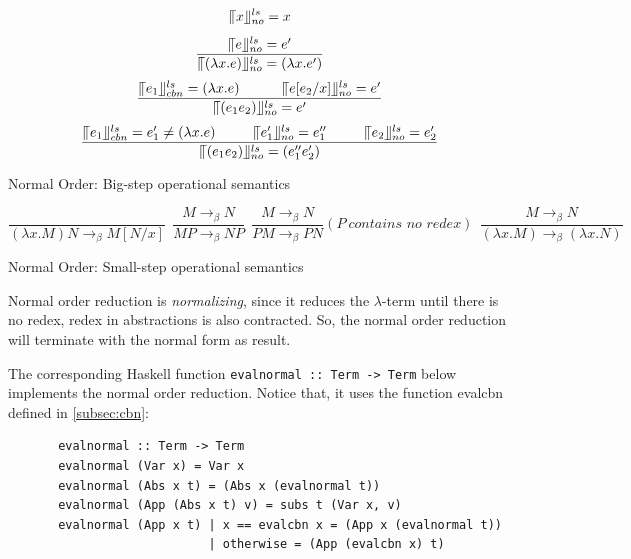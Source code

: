 \begin{equation*}
\llceil x \rrfloor ^{ls} _{no} = x
\end{equation*}
\begin{equation*}
\frac{\llceil e \rrfloor ^{ls} _{no} = e'}{\llceil (\lambda x.e) \rrfloor ^{ls} _{no} = (\lambda x.e')}
\end{equation*}
\begin{equation*}
\frac{\llceil e_1 \rrfloor ^{ls} _{cbn} = (\lambda x.e)\ \ \ \ \ \ \ \ \ \llceil e[e_2/x] \rrfloor ^{ls} _{no} = e'}{\llceil (e_1e_2) \rrfloor ^{ls} _{no} = e'}
\end{equation*}
\begin{equation*}
\frac{\llceil e_1 \rrfloor ^{ls} _{cbn} = e'_1\neq (\lambda x.e)\ \ \ \ \ \ \ \ \llceil e'_1 \rrfloor ^{ls} _{no} = e''_1\ \ \ \ \ \ \ \ \llceil e_2 \rrfloor ^{ls} _{no} = e'_2}{\llceil (e_1e_2) \rrfloor ^{ls} _{no} = (e''_1e'_2)}
\end{equation*}

\begin{center}
Normal Order: Big-step operational semantics
\end{center}

\begin{equation*}
\frac{}{(\lambda x.M)N \rightarrow _\beta M[N/x]}\ \  
\frac{M \rightarrow _\beta N}{MP \rightarrow _\beta NP}\ \ 
\frac{M \rightarrow _\beta N}{PM \rightarrow _\beta PN}(P\ \textit{contains no redex})\ \ 
\frac{M \rightarrow _\beta N}{(\lambda x.M) \rightarrow _\beta (\lambda x.N)}
\end{equation*}
\begin{center}
Normal Order: Small-step operational semantics
\end{center}

Normal order reduction is \textit{normalizing}, since it reduces the $\lambda$-term until there is no redex, redex in abstractions is also contracted. So, the normal order reduction will terminate with the normal form as result. 

The corresponding Haskell function \verb|evalnormal :: Term -> Term| below implements the normal order reduction. Notice that, it uses the function evalcbn defined in \ref{subsec:cbn}:

\begin{verbatim}
       evalnormal :: Term -> Term
       evalnormal (Var x) = Var x
       evalnormal (Abs x t) = (Abs x (evalnormal t))
       evalnormal (App (Abs x t) v) = subs t (Var x, v)
       evalnormal (App x t) | x == evalcbn x = (App x (evalnormal t))
                            | otherwise = (App (evalcbn x) t)
\end{verbatim}

